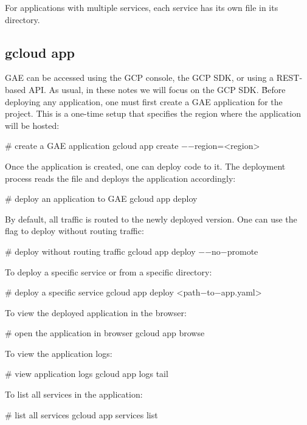 For applications with multiple services, each service has its own  file in its directory.

\subsection{gcloud app}

GAE can be accessed using the GCP console, the GCP SDK, or using a REST-based API. As usual, in these notes we will
focus on the GCP SDK\@. \v

Before deploying any application, one must first create a GAE application for the project. This is a one-time setup
that specifies the region where the application will be hosted:
\begin{bash}
# create a GAE application
gcloud app create $-$$-$region=<region>
\end{bash}

Once the application is created, one can deploy code to it. The deployment process reads the  file and
deploys the application accordingly:
\begin{bash}
# deploy an application to GAE
gcloud app deploy
\end{bash}

By default, all traffic is routed to the newly deployed version. One can use the  flag to deploy
without routing traffic:
\begin{bash}
# deploy without routing traffic
gcloud app deploy $-$$-$no$-$promote
\end{bash}

To deploy a specific service or from a specific directory:
\begin{bash}
# deploy a specific service
gcloud app deploy <path$-$to$-$app.yaml>
\end{bash}

To view the deployed application in the browser:
\begin{bash}
# open the application in browser
gcloud app browse
\end{bash}

To view the application logs:
\begin{bash}
# view application logs
gcloud app logs tail
\end{bash}

To list all services in the application:
\begin{bash}
# list all services
gcloud app services list
\end{bash}

